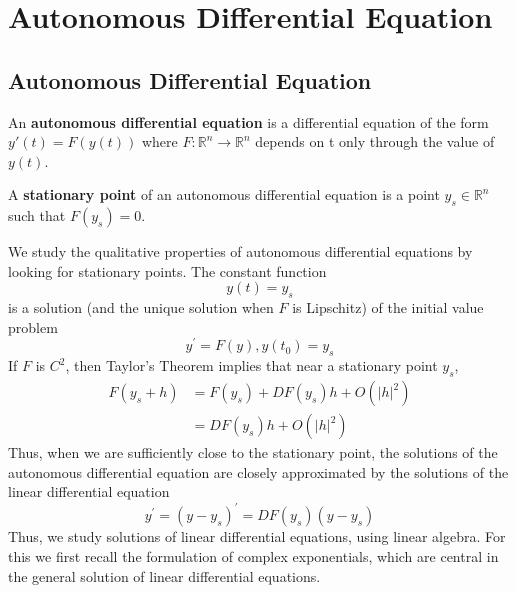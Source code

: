 \documentclass[11pt]{elegantbook}
\begin{document}
\section{Autonomous Differential Equation}
\subsection{Autonomous Differential Equation}
\begin{definition}
    \normalfont
    An \textbf{autonomous differential equation} is a differential equation of the form $y'(t) = F(y(t))$
    where $F : \mathbb{R}^n \rightarrow \mathbb{R}^n$ depends on t only through the value of $y(t)$.

    A \textbf{stationary point} of an autonomous differential equation is a point $y_s \in \mathbb{R}^n$ such that $F(y_s) = 0$.
\end{definition}

We study the qualitative properties of autonomous differential equations by looking for stationary points. The constant function
$$
y(t)=y_s
$$
is a solution (and the unique solution when $F$ is Lipschitz) of the initial value problem
$$
y^{\prime}=F(y), y\left(t_0\right)=y_s
$$
If $F$ is $C^2$, then Taylor's Theorem implies that near a stationary point $y_s$,
$$
\begin{aligned}
F\left(y_s+h\right) & =F\left(y_s\right)+D F\left(y_s\right) h+O\left(|h|^2\right) \\
& =D F\left(y_s\right) h+O\left(|h|^2\right)
\end{aligned}
$$
Thus, when we are sufficiently close to the stationary point, the solutions of the autonomous differential equation are closely approximated by the solutions of the linear differential equation
$$
y^{\prime}=\left(y-y_s\right)^{\prime}=D F\left(y_s\right)\left(y-y_s\right)
$$
Thus, we study solutions of linear differential equations, using linear algebra. For this we first recall the formulation of complex exponentials, which are central in the general solution of linear differential equations.
\end{document}
